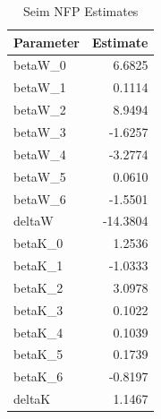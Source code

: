 \begin{table}
\caption{Seim NFP Estimates}
\label{tab:seim}
\begin{tabular}{lr}
\toprule
Parameter & Estimate \\
\midrule
betaW_0 & 6.6825 \\
betaW_1 & 0.1114 \\
betaW_2 & 8.9494 \\
betaW_3 & -1.6257 \\
betaW_4 & -3.2774 \\
betaW_5 & 0.0610 \\
betaW_6 & -1.5501 \\
deltaW & -14.3804 \\
betaK_0 & 1.2536 \\
betaK_1 & -1.0333 \\
betaK_2 & 3.0978 \\
betaK_3 & 0.1022 \\
betaK_4 & 0.1039 \\
betaK_5 & 0.1739 \\
betaK_6 & -0.8197 \\
deltaK & 1.1467 \\
\bottomrule
\end{tabular}
\end{table}
